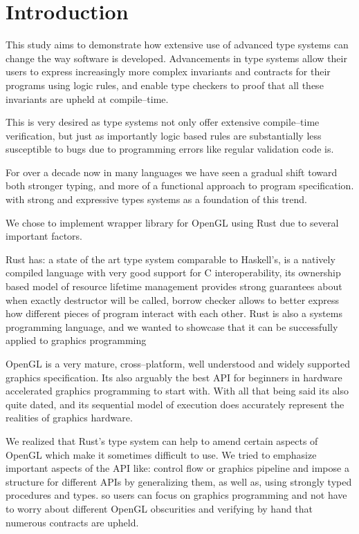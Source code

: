 \chapter*{Introduction}

This study aims to demonstrate how extensive use of advanced type systems can change the way software is developed.
Advancements in type systems allow their users to express increasingly more complex invariants and contracts for their programs using logic rules, 
and enable type checkers to proof that all these invariants are upheld at compile--time.

This is very desired as type systems not only offer extensive compile--time verification, but just as importantly logic based rules are substantially less susceptible to bugs
due to programming errors like regular validation code is.

For over a decade now in many languages we have seen a gradual shift toward both stronger typing, and more of a functional approach to program specification.
with strong and expressive types systems as a foundation of this trend.

We chose to implement wrapper library for OpenGL using Rust due to several important factors.

Rust has: a state of the art type system comparable to Haskell's, 
is a natively compiled language with very good support for C interoperability,
its ownership based model of resource lifetime management provides strong guarantees about when exactly destructor will be called,
borrow checker allows to better express how different pieces of program interact with each other.
Rust is also a systems programming language, and we wanted to showcase that it can be successfully applied to graphics programming \cite{rustpage}

OpenGL is a very mature, cross--platform, well understood and widely supported graphics specification.
Its also arguably the best API for beginners in hardware accelerated graphics programming to start with.
With all that being said its also quite dated, and its sequential model of execution does accurately represent the realities of graphics hardware.

We realized that Rust's type system can help to amend certain aspects of OpenGL which make it sometimes difficult to use.
We tried to emphasize important aspects of the API like: control flow or graphics pipeline and 
impose a structure for different APIs by generalizing them, as well as, using strongly typed procedures and types.
so users can focus on graphics programming and not have to worry about different OpenGL obscurities and verifying by hand that 
numerous contracts are upheld.
